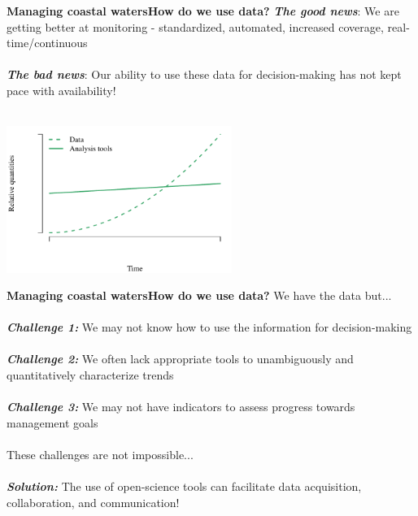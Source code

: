 \documentclass[serif]{beamer}\usepackage[]{graphicx}\usepackage[]{color}
\newcommand{\emtxt}[1]{\textbf{\textit{#1}}}
\begin{document}
\begin{frame}{\textbf{Managing coastal waters}}{\textbf{How do we use data?}}
\emtxt{The good news}: We are getting better at monitoring - standardized, automated, increased coverage, real-time/continuous \\~\\
\emtxt{The bad news}: Our ability to use these data for decision-making has not kept pace with availability! \\~\\


{\centering \includegraphics[width=0.55\textwidth]{fig/theo} 

}



\end{frame}

\begin{frame}{\textbf{Managing coastal waters}}{\textbf{How do we use data?}}
\onslide<+->
We have the data but... \\~\\
\emtxt{Challenge 1:} We may not know how to use the information for decision-making \\~\\
\emtxt{Challenge 2:} We often lack appropriate tools to unambiguously and quantitatively characterize trends \\~\\
\emtxt{Challenge 3:} We may not have indicators to assess progress towards management goals \\~\\
\onslide<+->
These challenges are not impossible...\\~\\
\emtxt{Solution:} The use of open-science tools can facilitate data acquisition, collaboration, and communication!
\end{frame}
\end{document}
